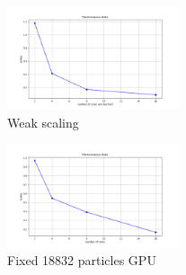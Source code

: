 \documentclass[a4paper,11pt]{article}
\begin{document}
\begin{figure}[htbp]
    \centering
    \includegraphics[width=0.45\textwidth]{job_error_weak.png}
    \caption{Weak scaling}
    \label{fig:weak}
\end{figure}

\begin{figure}[htbp]
    \centering
    \includegraphics[width=0.45\textwidth]{job_error_fixed_gpu.png}
    \caption{Fixed 18832 particles GPU}
    \label{fig:fixed_gpu}
\end{figure}
\end{document}
